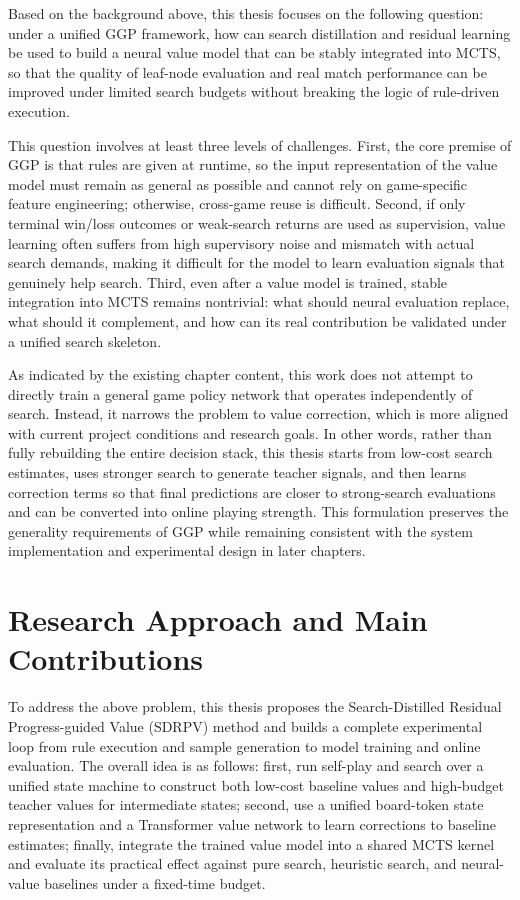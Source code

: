Based on the background above, this thesis focuses on the following question: under a unified GGP framework, how can search distillation and residual learning be used to build a neural value model that can be stably integrated into MCTS, so that the quality of leaf-node evaluation and real match performance can be improved under limited search budgets without breaking the logic of rule-driven execution.

This question involves at least three levels of challenges. First, the core premise of GGP is that rules are given at runtime, so the input representation of the value model must remain as general as possible and cannot rely on game-specific feature engineering; otherwise, cross-game reuse is difficult. Second, if only terminal win/loss outcomes or weak-search returns are used as supervision, value learning often suffers from high supervisory noise and mismatch with actual search demands, making it difficult for the model to learn evaluation signals that genuinely help search. Third, even after a value model is trained, stable integration into MCTS remains nontrivial: what should neural evaluation replace, what should it complement, and how can its real contribution be validated under a unified search skeleton.

As indicated by the existing chapter content, this work does not attempt to directly train a general game policy network that operates independently of search. Instead, it narrows the problem to value correction, which is more aligned with current project conditions and research goals. In other words, rather than fully rebuilding the entire decision stack, this thesis starts from low-cost search estimates, uses stronger search to generate teacher signals, and then learns correction terms so that final predictions are closer to strong-search evaluations and can be converted into online playing strength. This formulation preserves the generality requirements of GGP while remaining consistent with the system implementation and experimental design in later chapters.

\section{Research Approach and Main Contributions}

To address the above problem, this thesis proposes the Search-Distilled Residual Progress-guided Value (SDRPV) method and builds a complete experimental loop from rule execution and sample generation to model training and online evaluation. The overall idea is as follows: first, run self-play and search over a unified state machine to construct both low-cost baseline values and high-budget teacher values for intermediate states; second, use a unified board-token state representation and a Transformer value network to learn corrections to baseline estimates; finally, integrate the trained value model into a shared MCTS kernel and evaluate its practical effect against pure search, heuristic search, and neural-value baselines under a fixed-time budget.

